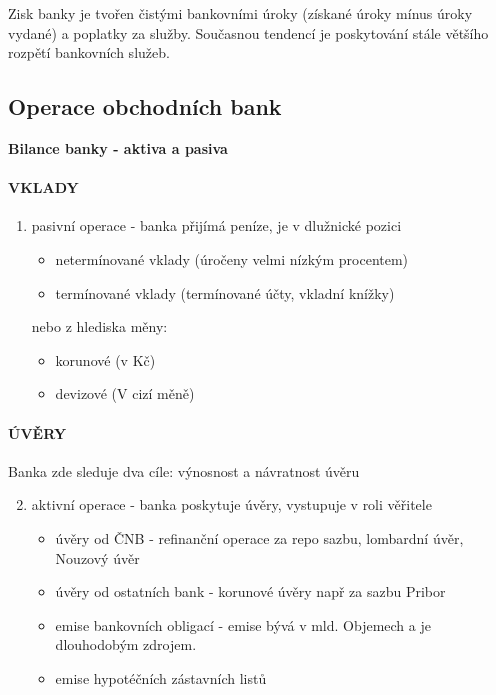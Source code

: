 Zisk banky je tvořen čistými bankovními úroky (získané úroky mínus úroky vydané) a poplatky za služby. Současnou tendencí je poskytování stále většího rozpětí bankovních služeb.

\subsection*{Operace obchodních bank}

\textbf{Bilance banky - aktiva a pasiva}

\paragraph{VKLADY}
\begin{enumerate}
    \item pasivní operace - banka přijímá peníze, je v dlužnické pozici
        \begin{itemize}
            \item netermínované vklady (úročeny velmi nízkým procentem)
            \item termínované vklady (termínované účty, vkladní knížky)
        \end{itemize}
        nebo z hlediska měny:
        \begin{itemize}
            \item korunové (v Kč)
            \item devizové (V cizí měně)
        \end{itemize}
\end{enumerate}

\paragraph{ÚVĚRY}
Banka zde sleduje dva cíle: výnosnost a návratnost úvěru
\begin{enumerate}
    \setcounter{enumi}{1}
    \item aktivní operace - banka poskytuje úvěry, vystupuje v roli věřitele
        \begin{itemize}
            \item úvěry od ČNB - refinanční operace za repo sazbu, lombardní úvěr, Nouzový úvěr
            \item úvěry od ostatních bank - korunové úvěry např za sazbu Pribor
            \item emise bankovních obligací - emise bývá v mld. Objemech a je dlouhodobým zdrojem.
            \item emise hypotéčních zástavních listů
        \end{itemize}
\end{enumerate}


